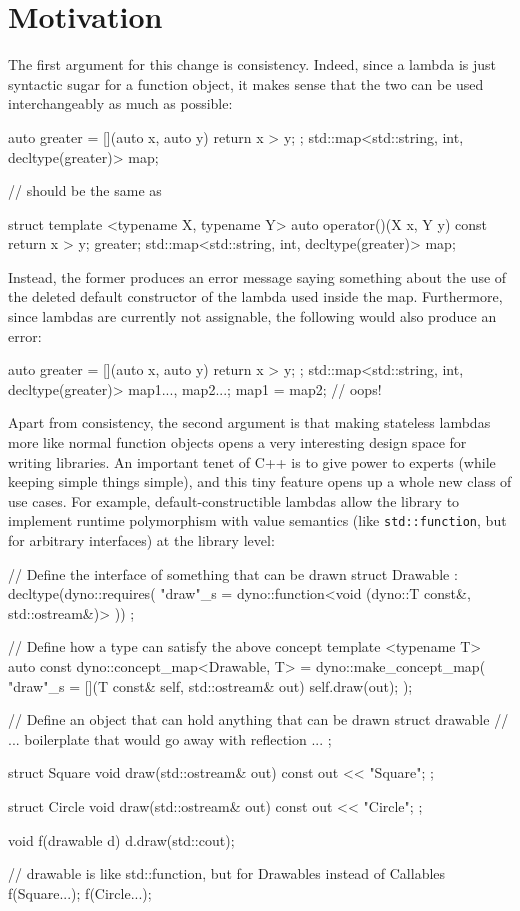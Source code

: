 \documentclass{wg21}
\newcommand{\cc}[1]{\texttt{#1}}
\begin{document}
\section{Motivation}
The first argument for this change is consistency. Indeed, since a lambda is
just syntactic sugar for a function object, it makes sense that the two can be
used interchangeably as much as possible:

\begin{cpp}
auto greater = [](auto x, auto y) { return x > y; };
std::map<std::string, int, decltype(greater)> map;

// should be the same as

struct {
  template <typename X, typename Y>
  auto operator()(X x, Y y) const { return x > y; }
} greater;
std::map<std::string, int, decltype(greater)> map;
\end{cpp}

Instead, the former produces an error message saying something about the use
of the deleted default constructor of the lambda used inside the map. Furthermore,
since lambdas are currently not assignable, the following would also produce an
error:

\begin{cpp}
auto greater = [](auto x, auto y) { return x > y; };
std::map<std::string, int, decltype(greater)> map1{...}, map2{...};
map1 = map2; // oops!
\end{cpp}

Apart from consistency, the second argument is that making stateless lambdas
more like normal function objects opens a very interesting design space for
writing libraries. An important tenet of C++ is to give power to experts
(while keeping simple things simple), and this tiny feature opens up a whole
new class of use cases. For example, default-constructible lambdas allow the
\cite{Dyno} library to implement runtime polymorphism with value semantics
(like \cc{std::function}, but for arbitrary interfaces) at the library level:

\begin{cpp}
// Define the interface of something that can be drawn
struct Drawable : decltype(dyno::requires(
  "draw"_s = dyno::function<void (dyno::T const&, std::ostream&)>
)) { };

// Define how a type can satisfy the above concept
template <typename T>
auto const dyno::concept_map<Drawable, T> = dyno::make_concept_map(
  "draw"_s = [](T const& self, std::ostream& out) { self.draw(out); }
);

// Define an object that can hold anything that can be drawn
struct drawable {
  // ... boilerplate that would go away with reflection ...
};

struct Square {
  void draw(std::ostream& out) const { out << "Square"; }
};

struct Circle {
  void draw(std::ostream& out) const { out << "Circle"; }
};

void f(drawable d) {
  d.draw(std::cout);
}

// drawable is like std::function, but for Drawables instead of Callables
f(Square{...});
f(Circle{...});
\end{cpp}
\end{document}
